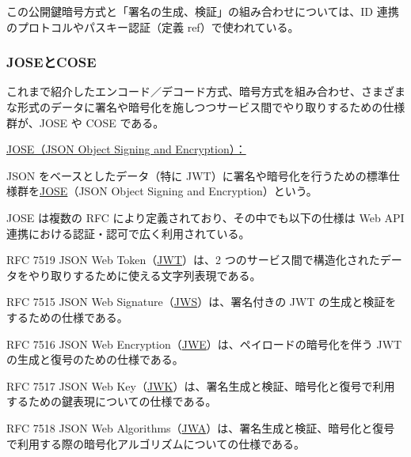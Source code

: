 \documentclass[uplatex]{jsarticle}
\def\ref#1{ref}%
\def\label#1{}%
\newcounter{thm}[section]
\begin{document}
この公開鍵暗号方式と「署名の生成、検証」の組み合わせについては、ID 連携のプロトコルやパスキー認証（定義 \ref{dfn:passkey}）で使われている。

\subsubsection{JOSEとCOSE}

これまで紹介したエンコード／デコード方式、暗号方式を組み合わせ、さまざまな形式のデータに署名や暗号化を施しつつサービス間でやり取りするための仕様群が、JOSE や COSE である。

\underline{JOSE（JSON Object Signing and Encryption）：}

\begin{dfn}[JOSE]\label{dfn:jose}
JSON をベースとしたデータ（特に JWT）に署名や暗号化を行うための標準仕様群を\underline{JOSE}（JSON Object Signing and Encryption）という。
\end{dfn}

JOSE は複数の RFC により定義されており、その中でも以下の仕様は Web API 連携における認証・認可で広く利用されている。

\begin{dfn}[JWT]\label{dfn:jwt}
RFC 7519 JSON Web Token（\underline{JWT}）は、2 つのサービス間で構造化されたデータをやり取りするために使える文字列表現である。
\end{dfn}

\begin{dfn}[JWS]\label{dfn:ch6-jws}
RFC 7515 JSON Web Signature（\underline{JWS}）は、署名付きの JWT の生成と検証をするための仕様である。
\end{dfn}

\begin{dfn}[JWE]\label{dfn:ch6-jwe}
RFC 7516 JSON Web Encryption（\underline{JWE}）は、ペイロードの暗号化を伴う JWT の生成と復号のための仕様である。
\end{dfn}

\begin{dfn}[JWK]\label{dfn:ch6-jwk}
RFC 7517 JSON Web Key（\underline{JWK}）は、署名生成と検証、暗号化と復号で利用するための鍵表現についての仕様である。
\end{dfn}

\begin{dfn}[JWA]\label{dfn:ch6-jwa}
RFC 7518 JSON Web Algorithms（\underline{JWA}）は、署名生成と検証、暗号化と復号で利用する際の暗号化アルゴリズムについての仕様である。
\end{dfn}
\end{document}
